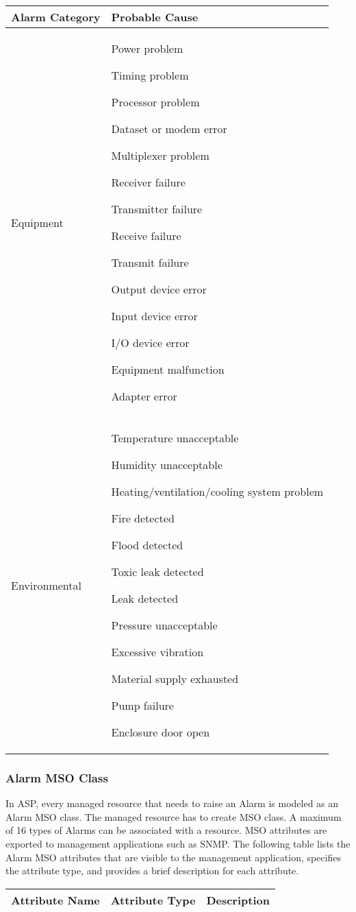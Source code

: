 \begin{flushleft}
\begin{tabular}{|l|p{4in}|}
\hline
 {\bf Alarm Category} & {\bf Probable Cause} \\
\hline

Equipment & Power problem \par
Timing problem \par
Processor problem \par
Dataset or modem error \par
Multiplexer problem \par
Receiver failure \par
Transmitter failure \par
Receive failure \par
Transmit failure \par
Output device error \par
Input device error \par
I/O device error \par
Equipment malfunction \par
Adapter error\\
\hline
Environmental & Temperature unacceptable \par
Humidity unacceptable \par
Heating/ventilation/cooling system problem \par
Fire detected \par
Flood detected \par
Toxic leak detected \par
Leak detected \par
Pressure unacceptable \par
Excessive vibration \par
Material supply exhausted \par
Pump failure \par
Enclosure door open \par
\\
\hline


\end{tabular}  

\subsubsection{Alarm MSO Class}

In ASP, every managed resource that needs to raise an Alarm is modeled as an Alarm MSO class. The managed resource has to create MSO class. A maximum of 
16 types of Alarms can be associated with a resource. MSO attributes are exported to management applications such as SNMP. The following table lists the
Alarm MSO attributes that are visible to the management application, specifies the attribute type, and provides a brief description for each attribute.
\begin{tabular}{|l|p{2in}|p{3in}|}
\hline
 {\bf Attribute Name} & {\bf Attribute Type} & {\bf Description}\\
\hline


\end{tabular}
\end{flushleft}
